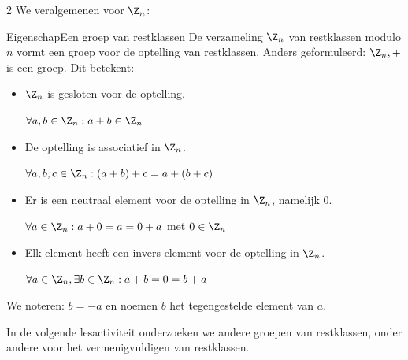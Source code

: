 \begin{multicols}{2}
		We veralgemenen voor $\Z_n$:
	\begin{kader}{Eigenschap}{Een groep van restklassen}
	De verzameling $\Z_n$ van restklassen modulo $n$ vormt een groep voor de optelling van restklassen. Anders geformuleerd: $\Z_n,+$ is een groep. Dit betekent:
	\begin{itemize}
		\item $\Z_n$ is gesloten voor de optelling.\par
		$\forall a,b \in \Z_n: a+b \in \Z_n$
		\item De optelling is associatief in $\Z_n$.\par
		$\forall a,b,c \in \Z_n: (a+b)+c=a+(b+c)$
  \end{itemize}
	\end{kader}
\newpage
 \begin{kader}{}{}
 \begin{itemize}
		\item Er is een neutraal element voor de optelling in $\Z_n$, namelijk $0$.\par
		$\forall a \in \Z_n: a+0=a=0+a$ met $0\in \Z_n$
  
		\item Elk element heeft een invers element voor de optelling in $\Z_n$.\par
		$\forall a \in \Z_n, \exists b\in \Z_n: a+b=0=b+a$ 
	\end{itemize}
\end{kader}  

  We noteren: $b=-a$ en noemen $b$ het tegengestelde element van $a$.
  
	In de volgende lesactiviteit onderzoeken we andere groepen van restklassen, onder andere voor het vermenigvuldigen van restklassen.
	\end{multicols}
		
